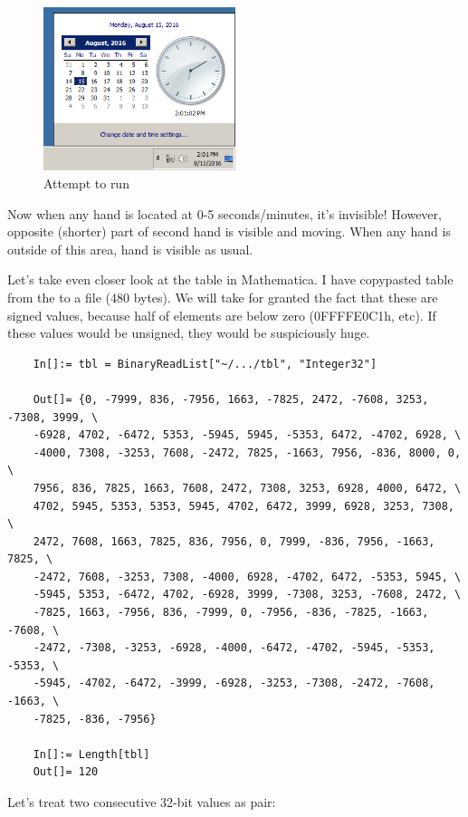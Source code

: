 \begin{figure}[H]
\centering
\includegraphics[width=0.5\textwidth]{examples/timedate/6_pairs_zeroed.png}
\caption{Attempt to run}
\end{figure}

Now when any hand is located at 0-5 seconds/minutes, it's invisible! However, opposite (shorter) part of second hand
is visible and moving.
When any hand is outside of this area, hand is visible as usual.

Let's take even closer look at the table in Mathematica.
I have copypasted table from the  to a  file (480 bytes).
We will take for granted the fact that these are signed values, because half of elements are below zero (0FFFFE0C1h, etc).
If these values would be unsigned, they would be suspiciously huge.

\begin{lstlisting}
	In[]:= tbl = BinaryReadList["~/.../tbl", "Integer32"]

	Out[]= {0, -7999, 836, -7956, 1663, -7825, 2472, -7608, 3253, -7308, 3999, \
	-6928, 4702, -6472, 5353, -5945, 5945, -5353, 6472, -4702, 6928, \
	-4000, 7308, -3253, 7608, -2472, 7825, -1663, 7956, -836, 8000, 0, \
	7956, 836, 7825, 1663, 7608, 2472, 7308, 3253, 6928, 4000, 6472, \
	4702, 5945, 5353, 5353, 5945, 4702, 6472, 3999, 6928, 3253, 7308, \
	2472, 7608, 1663, 7825, 836, 7956, 0, 7999, -836, 7956, -1663, 7825, \
	-2472, 7608, -3253, 7308, -4000, 6928, -4702, 6472, -5353, 5945, \
	-5945, 5353, -6472, 4702, -6928, 3999, -7308, 3253, -7608, 2472, \
	-7825, 1663, -7956, 836, -7999, 0, -7956, -836, -7825, -1663, -7608, \
	-2472, -7308, -3253, -6928, -4000, -6472, -4702, -5945, -5353, -5353, \
	-5945, -4702, -6472, -3999, -6928, -3253, -7308, -2472, -7608, -1663, \
	-7825, -836, -7956}

	In[]:= Length[tbl]
	Out[]= 120
\end{lstlisting}

Let's treat two consecutive 32-bit values as pair:

